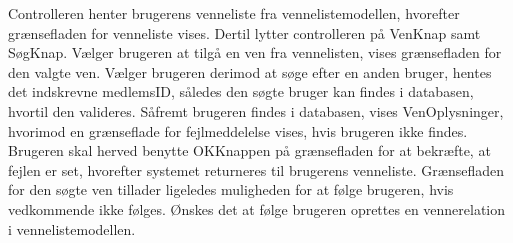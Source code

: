 \noindent
Controlleren henter brugerens venneliste fra vennelistemodellen, hvorefter grænsefladen for venneliste vises. Dertil lytter controlleren på VenKnap samt SøgKnap. Vælger brugeren at tilgå en ven fra vennelisten, vises grænsefladen for den valgte ven. Vælger brugeren derimod at søge efter en anden bruger, hentes det indskrevne medlemsID, således den søgte bruger kan findes i databasen, hvortil den valideres. Såfremt brugeren findes i databasen, vises VenOplysninger, hvorimod en grænseflade for fejlmeddelelse vises, hvis brugeren ikke findes. Brugeren skal herved benytte OKKnappen på grænsefladen for at bekræfte, at fejlen er set, hvorefter systemet returneres til brugerens venneliste.
Grænsefladen for den søgte ven tillader ligeledes muligheden for at følge brugeren, hvis vedkommende ikke følges. Ønskes det at følge brugeren oprettes en vennerelation i vennelistemodellen. 












